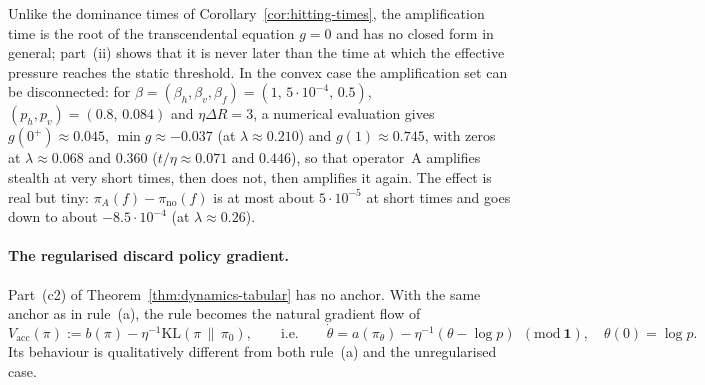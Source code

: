 \begin{remark}\label{rem:reentrance}
Unlike the dominance times of Corollary~\ref{cor:hitting-times}, the
amplification time is the root of the transcendental equation $g=0$ and
has no closed form in general; part~(ii) shows that it is never later than
the time at which the effective pressure reaches the static threshold. In
the convex case the amplification set can be disconnected: for
$\beta=(\beta_h,\beta_v,\beta_f)=(1,\,5\cdot10^{-4},\,0.5)$,
$(p_h,p_v)=(0.8,\,0.084)$ and $\eta\Delta R=3$, a numerical evaluation gives
$g(0^+)\approx0.045$, $\min g\approx-0.037$ (at $\lambda\approx0.210$) and $g(1)\approx0.745$, with zeros at $\lambda\approx0.068$ and $0.360$ ($t/\eta\approx0.071$ and $0.446$), so that
operator~A amplifies stealth at very short times, then does not, then
amplifies it again. The effect is real but tiny: $\pi_A(f)-\pi_{\mathrm{no}}(f)$ is at most about $5\cdot10^{-5}$ at short times and goes down to about $-8.5\cdot10^{-4}$ (at $\lambda\approx0.26$).
\end{remark}

\paragraph{The regularised discard policy gradient.}
Part~(c2) of Theorem~\ref{thm:dynamics-tabular} has no anchor. With the
same anchor as in rule~(a), the rule becomes the natural gradient flow of
\[
V_{\mathrm{acc}}(\pi):=b(\pi)-\eta^{-1}\mathrm{KL}(\pi\,\|\,\pi_0),
\qquad\text{i.e.}\qquad
\dot\theta=a(\pi_\theta)-\eta^{-1}(\theta-\log p)\ \ (\mathrm{mod}\ \mathbf 1),
\quad\theta(0)=\log p .
\]
Its behaviour is qualitatively different from both rule~(a) and the
unregularised case.

